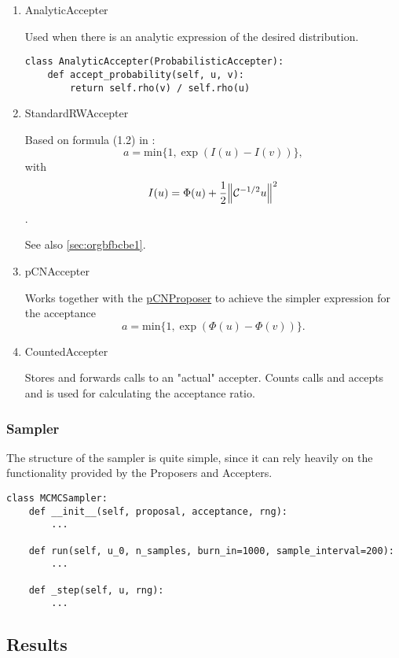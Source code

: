 \documentclass[11pt]{article}
\newcommand{\C}{{\mathcal{C}}}
\begin{document}
\begin{enumerate}
\item AnalyticAccepter
\label{sec:orgfad4738}

Used when there is an analytic expression of the desired distribution.

\begin{verbatim}
class AnalyticAccepter(ProbabilisticAccepter):
    def accept_probability(self, u, v):
        return self.rho(v) / self.rho(u)
\end{verbatim}

\item StandardRWAccepter
\label{sec:orgef2747a}

Based on formula (1.2) in \cite{cotter_mcmc_2013}:
$$a = \text{min}\{1, \exp(I(u) - I(v))\},$$ with
$$I(u) = \Phi(u) + \frac{1}{2}\norm{\C^{-1/2}u}^2$$.

See also \ref{sec:orgbfbcbe1}.

\item pCNAccepter
\label{sec:orga79b011}

Works together with the \hyperref[sec:org7442233]{pCNProposer} to achieve the simpler expression for the acceptance
$$a = \text{min}\{1, \exp(\Phi(u) - \Phi(v))\}.$$

\item CountedAccepter
\label{sec:orgedec74e}

Stores and forwards calls to an "actual" accepter. Counts calls and accepts and is used for
calculating the acceptance ratio.
\end{enumerate}

\subsubsection{Sampler}
\label{sec:orgc42d820}

The structure of the sampler is quite simple, since it can rely heavily on the functionality
provided by the Proposers and Accepters.

\begin{verbatim}
class MCMCSampler:
    def __init__(self, proposal, acceptance, rng):
        ...

    def run(self, u_0, n_samples, burn_in=1000, sample_interval=200):
        ...

    def _step(self, u, rng):
        ...
\end{verbatim}

\subsection{Results}
\label{sec:org5afe8ff}
\end{document}
